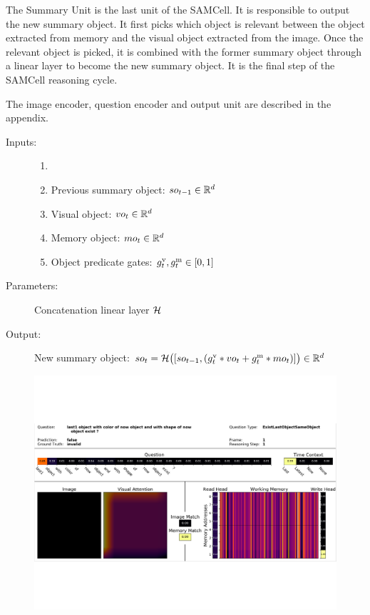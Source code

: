 
The  Summary Unit is the last unit of the SAMCell. It is responsible to output the new summary object. It first picks which object is relevant between the object extracted from memory and the visual object extracted from the image. Once the relevant object is picked, it is combined with the former summary object through a linear layer to become the new summary object. It is the final step of the SAMCell reasoning cycle. 

The image encoder, question encoder and output unit are described in the appendix.

\begin{description}
	\item[Inputs:] 
	\begin{enumerate}
		\item[]
		\item Previous summary object: $so_{t-1} \in \mathbb{R}^d$
		\item Visual object: $vo_t \in \mathbb{R}^d$
		\item Memory object: $mo_t \in \mathbb{R}^d$
		\item Object predicate gates: $g^{\mathrm{v}}_t, g^{\mathrm{m}}_t \in [0,1]$
	\end{enumerate}
	
	\item[Parameters:] Concatenation linear layer $\mathcal{H}$ 
	
	\item[Output:] 
	New summary object:
	$so_t = \mathcal{H}\bigl([so_{t-1}, (g^{\mathrm{v}}_t * vo_t + g^{\mathrm{m}}_t * mo_t)]\bigr) \in \mathbb{R}^d$ 
	
\end{description}


\noindent\makebox[\linewidth]{\rule{\paperwidth}{1pt}}



\begin{figure}
	\includegraphics[width=\textwidth]{img/model2}
	\label{fig:model2}
\end{figure}	

